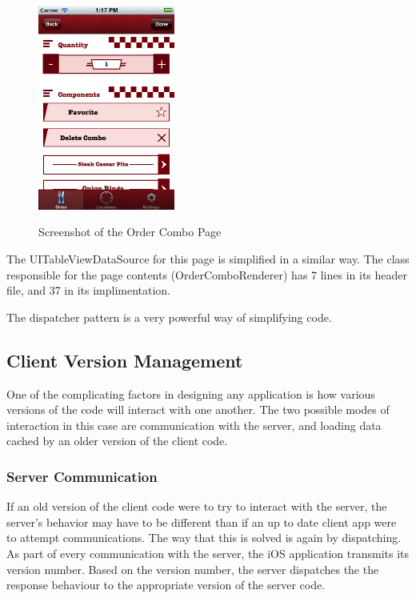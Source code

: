 \documentclass[se]{uw-wkrpt}
\begin{document}
\begin{figure}[h!]
  \caption{Screenshot of the Order Combo Page}
  \centering
    \includegraphics[width=0.4\textwidth]{orderComboPage}
  \label{fig:Combo Page}
\end{figure}

The UITableViewDataSource for this page is simplified in a similar way. The class responsible
for the page contents (OrderComboRenderer) has 7 lines in its header file, and 37 in its implimentation.


The dispatcher pattern is a very powerful way of simplifying code.

\subsection{Client Version Management}

One of the complicating factors in designing any application is how various versions of the code will
interact with one another. The two possible modes of interaction in this case are communication with
the server, and loading data cached by an older version of the client code. 

\subsubsection{Server Communication}

If an old version of the client code were to try to interact with the server, the server's behavior
may have to be different than if an up to date client app were to attempt communications. The way that
this is solved is again by dispatching. As part of every communication with the server, the iOS application
transmits its version number. Based on the version number, the server dispatches the the response behaviour
to the appropriate version of the server code.
\end{document}
